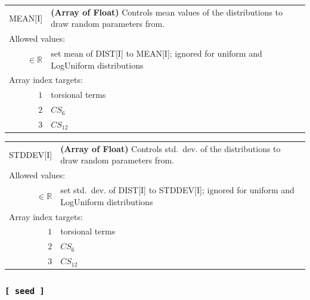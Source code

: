 \documentclass[10pt,a4paper]{report}
\numberwithin{equation}{section}
\begin{document}
{
\begin{tabular}{r@{ : }l}
\label{descr:mean}
      MEAN[I]&\textbf{(Array of Float)} Controls mean values of the distributions to draw random parameters from.                            \\ 
\multicolumn{2}{l}{Allowed values:} \\ 
\(\in\mathbb{R}\)&set mean of DIST[I] to MEAN[I]; ignored for uniform and LogUniform distributions                                                                       \\ 
\multicolumn{2}{l}{Array index targets:} \\ 
     \(1\)&torsional terms                                                                                      \\ 
     \(2\)&$CS_6$                                                                                               \\ 
     \(3\)&$CS_{12}$                                                                                            \\ 
\end{tabular}
\vspace{1ex}
}

{
\begin{tabular}{r@{ : }l}
\label{descr:stddev}
    STDDEV[I]&\textbf{(Array of Float)} Controls std.~dev. of the distributions to draw random parameters from.                              \\ 
\multicolumn{2}{l}{Allowed values:} \\ 
\(\in\mathbb{R}\)&set std.~dev. of DIST[I] to STDDEV[I]; ignored for uniform and LogUniform distributions                                                       \\ 
\multicolumn{2}{l}{Array index targets:} \\ 
     \(1\)&torsional terms                                                                                      \\ 
     \(2\)&$CS_6$                                                                                               \\ 
     \(3\)&$CS_{12}$                                                                                            \\ 
\end{tabular}
\vspace{1ex}
}

\subsubsection{\texttt{[~seed~]}}
\label{sec:inp-seed}
\end{document}

